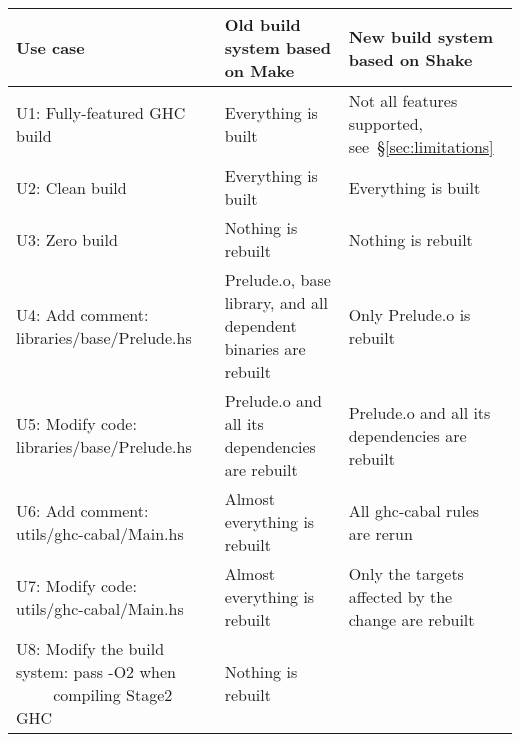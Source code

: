 \newcommand{\checkedbox}{\makebox[0pt][l]{$\square$}\raisebox{.15ex}{\hspace{0.1em}$\checkmark$}}
\newcommand{\uncheckedbox}{\makebox[0pt][l]{$\square$}\raisebox{.15ex}{\hspace{0.92em}}}
\begin{table*}[t]
\centering
\begin{tabular}{p{60mm} || p{50mm} | p{50mm}}
\textbf{Use case}
& \textbf{Old build system} based on Make
& \textbf{New build system} based on Shake
\\
\hline
\textsf{U1:} Fully-featured GHC build
& Everything is built \hfill \checkedbox
& Not all features supported, see~\S\ref{sec:limitations} \hfill \uncheckedbox
\\
\textsf{U2:} Clean build
& Everything is built \hfill \checkedbox
& Everything is built \hfill \checkedbox
\\
\textsf{U3:} Zero build \hspace{6.4mm}
& Nothing is rebuilt \hfill \checkedbox
& Nothing is rebuilt \hfill \checkedbox
\\
\hline
\textsf{U4:} Add comment: \textsf{libraries/base/Prelude.hs}
& \textsf{Prelude.o}, \textsf{base} library, and all \hfill \uncheckedbox
\newline dependent binaries are rebuilt
& Only \textsf{Prelude.o} is rebuilt \hfill \checkedbox
\\
\textsf{U5:} Modify code: \hspace{1.75mm}\textsf{libraries/base/Prelude.hs}
& \textsf{Prelude.o} and all its dependencies \hfill \checkedbox \newline
are rebuilt
& \textsf{Prelude.o} and all its dependencies \hfill \checkedbox \newline
are rebuilt
\\
\textsf{U6:} Add comment: \textsf{utils/ghc-cabal/Main.hs}
& Almost everything is rebuilt \hfill \uncheckedbox
& All \textsf{ghc-cabal} rules are rerun \hfill \uncheckedbox
\\
\textsf{U7:} Modify code: \hspace{1.75mm}\textsf{utils/ghc-cabal/Main.hs}
& Almost everything is rebuilt \hfill \uncheckedbox
& Only the targets affected by the \hfill \checkedbox \newline change are rebuilt
\\
\hline
\textsf{U8:} Modify the build system: pass \textsf{-O2} when \newline
$\textit{~~~~~~~}$compiling Stage2 GHC
& Nothing is rebuilt \hfill \uncheckedbox

\end{tabular}
\end{table*}

